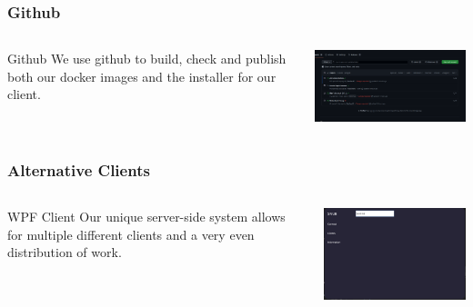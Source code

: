 \documentclass[aspectratio=169]{beamer}
\begin{document}
\begin{frame}
    \frametitle{Github}

    \begin{columns}
        \begin{column}{0.28\textwidth}
            \begin{block}{Github}
                We use github to build, check and publish both our docker images and the installer for our client.
            \end{block}
        \end{column}
        \begin{column}{0.58\textwidth}
            \includegraphics[width=9cm]{github.png}
        \end{column}
    \end{columns}
\end{frame}

\begin{frame}
    \frametitle{Alternative Clients}

    \begin{columns}
        \begin{column}{0.38\textwidth}
            \begin{block}{WPF Client}
                Our unique server-side system allows for multiple different clients and a very even distribution of work.
            \end{block}
        \end{column}
        \begin{column}{0.58\textwidth}
            \includegraphics[width=9cm]{WpfBluePrint.png}
        \end{column}
    \end{columns}
\end{frame}
\end{document}
